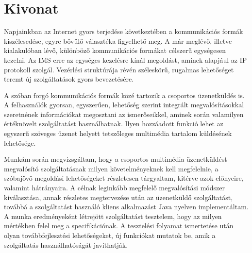 
\section*{Kivonat}

Napjainkban az Internet gyors terjedése következtében a kommunikációs formák kiszélesedése, egyre bővülő választéka figyelhető meg. A már meglévő, illetve kialakulóban lévő, különböző kommunikációs formákat célszerű egységesen kezelni. Az IMS erre az egységes kezelésre kínál megoldást, aminek alapjául az IP protokoll szolgál. Vezérlési struktúrája révén széleskörű, rugalmas lehetőséget teremt új szolgáltatások gyors bevezetésére.

A szóban forgó kommunikációs formák közé tartozik a csoportos üzenetküldés is. A felhasználók gyorsan, egyszerűen, lehetőség szerint integrált megvalósításokkal szeretnének információkat megosztani az ismerőseikkel, aminek során valamilyen értéknövelt szolgáltatást használhatnak. Ilyen hozzáadott funkció lehet az egyszerű szöveges üzenet helyett tetszőleges multimédia tartalom küldésének lehetősége.

Munkám során megvizsgáltam, hogy a csoportos multimédia üzenetküldést megvalósító szolgáltatásnak milyen követelményeknek kell megfelelnie, a szóbajövő megoldási lehetőségeket részletesen tárgyaltam, kitérve azok előnyeire, valamint hátrányaira. A célnak leginkább megfelelő megvalósítási módszer kiválasztása, annak részletes megtervezése után az üzenetküldő szolgáltatást, továbbá a szolgáltatást használó kliens alkalmazást Java nyelven implementáltam. A munka eredményeként létrejött szolgáltatást tesztelem, hogy az milyen mértékben felel meg a specifikációnak. A tesztelési folyamat ismertetése után olyan továbbfejlesztési lehetőségeket, új funkciókat mutatok be, amik a szolgáltatás használhatóságát javíthatják.
